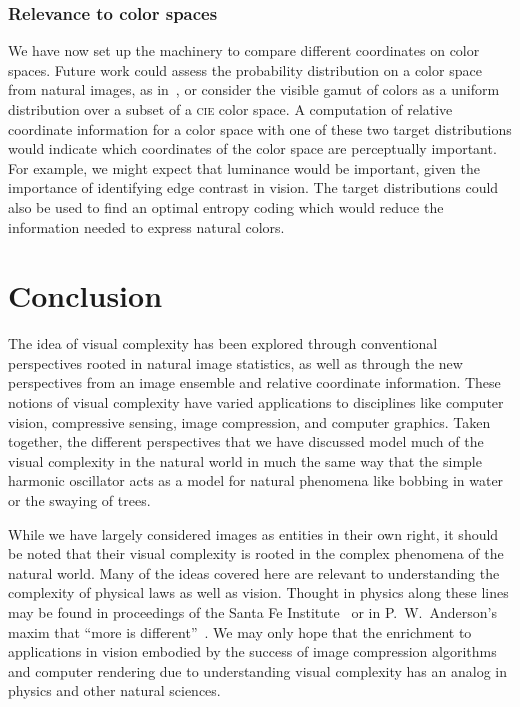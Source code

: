 \documentclass[aps,reprint,floatfix]{revtex4-2}
\theoremstyle{plain}
\theoremstyle{definition}
\begin{document}
\subsubsection{Relevance to color spaces}

We have now set up the machinery to compare different coordinates on color
spaces. Future work could assess the probability distribution on a color space
from natural images, as in~\cite{natstat-color}, or consider the visible gamut
of colors as a uniform distribution over a subset of a \textsc{cie} color space.
A computation of relative coordinate information for a color space with one of
these two target distributions would indicate which coordinates of the color
space are perceptually important. For example, we might expect that luminance
would be important, given the importance of identifying edge contrast in vision.
The target distributions could also be used to find an optimal entropy coding
which would reduce the information needed to express natural colors.

\section{Conclusion}

The idea of visual complexity has been explored through conventional
perspectives rooted in natural image statistics, as well as through the new
perspectives from an image ensemble and relative coordinate information. These
notions of visual complexity have varied applications to disciplines like
computer vision, compressive sensing, image compression, and computer graphics.
Taken together, the different perspectives that we have discussed model much of
the visual complexity in the natural world in much the same way that the simple
harmonic oscillator acts as a model for natural phenomena like bobbing in water
or the swaying of trees.

While we have largely considered images as entities in their own right, it
should be noted that their visual complexity is rooted in the complex phenomena
of the natural world. Many of the ideas covered here are relevant to
understanding the complexity of physical laws as well as vision. Thought in
physics along these lines may be found in proceedings of the Santa Fe
Institute~\cite{santa-fe} or in P.\ W.\ Anderson's maxim that ``more is
different''~\cite{anderson}. We may only hope that the enrichment to
applications in vision embodied by the success of image compression algorithms
and computer rendering due to understanding visual complexity has an analog in
physics and other natural sciences.
\end{document}
